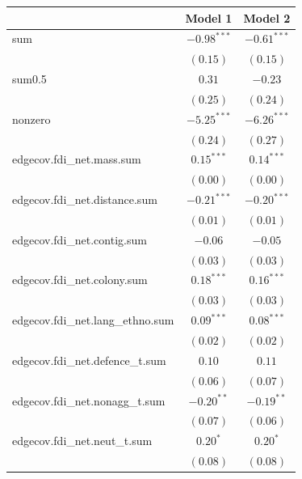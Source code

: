 \documentclass{article}
\begin{document}
\begin{table}
\begin{center}
\begin{tabular}{l c c }
\hline
 & Model 1 & Model 2 \\
\hline
sum                              & $-0.98^{***}$ & $-0.61^{***}$ \\
                                 & $(0.15)$      & $(0.15)$      \\
sum0.5                           & $0.31$        & $-0.23$       \\
                                 & $(0.25)$      & $(0.24)$      \\
nonzero                          & $-5.25^{***}$ & $-6.26^{***}$ \\
                                 & $(0.24)$      & $(0.27)$      \\
edgecov.fdi\_net.mass.sum        & $0.15^{***}$  & $0.14^{***}$  \\
                                 & $(0.00)$      & $(0.00)$      \\
edgecov.fdi\_net.distance.sum    & $-0.21^{***}$ & $-0.20^{***}$ \\
                                 & $(0.01)$      & $(0.01)$      \\
edgecov.fdi\_net.contig.sum      & $-0.06$       & $-0.05$       \\
                                 & $(0.03)$      & $(0.03)$      \\
edgecov.fdi\_net.colony.sum      & $0.18^{***}$  & $0.16^{***}$  \\
                                 & $(0.03)$      & $(0.03)$      \\
edgecov.fdi\_net.lang\_ethno.sum & $0.09^{***}$  & $0.08^{***}$  \\
                                 & $(0.02)$      & $(0.02)$      \\
edgecov.fdi\_net.defence\_t.sum  & $0.10$        & $0.11$        \\
                                 & $(0.06)$      & $(0.07)$      \\
edgecov.fdi\_net.nonagg\_t.sum   & $-0.20^{**}$  & $-0.19^{**}$  \\
                                 & $(0.07)$      & $(0.06)$      \\
edgecov.fdi\_net.neut\_t.sum     & $0.20^{*}$    & $0.20^{*}$    \\
                                 & $(0.08)$      & $(0.08)$      \\

\end{tabular}
\end{center}
\end{table}
\end{document}
